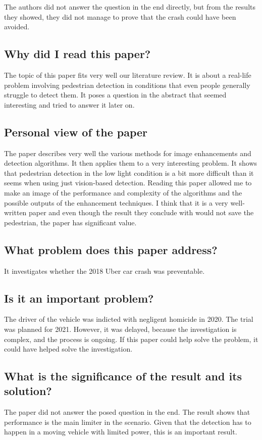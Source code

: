 \documentclass[11pt,a4paper]{article}
\begin{document}
The authors did not answer the question in the end directly, but from the results they showed, they did not manage to prove that the crash could have been avoided.

\subsection*{Why did I read this paper?}
The topic of this paper fits very well our literature review. It is about a real-life problem involving pedestrian detection in conditions that even people generally struggle to detect them. It poses a question in the abstract that seemed interesting and tried to answer it later on.
\subsection*{Personal view of the paper}
The paper describes very well the various methods for image enhancements and detection algorithms. It then applies them to a very interesting problem. It shows that pedestrian detection in the low light condition is a bit more difficult than it seems when using just vision-based detection. Reading this paper allowed me to make an image of the performance and complexity of the algorithms and the possible outputs of the enhancement techniques. I think that it is a very well-written paper and even though the result they conclude with would not save the pedestrian, the paper has significant value.
\subsection*{What problem does this paper address?}
It investigates whether the 2018 Uber car crash was preventable.
\subsection*{Is it an important problem?}
The driver of the vehicle was indicted with negligent homicide in 2020. The trial was planned for 2021. However, it was delayed, because the investigation is complex, and the process is ongoing. If this paper could help solve the problem, it could have helped solve the investigation.
\subsection*{What is the significance of the result and its solution?}
The paper did not answer the posed question in the end. The result shows that performance is the main limiter in the scenario. Given that the detection has to happen in a moving vehicle with limited power, this is an important result.
\end{document}
